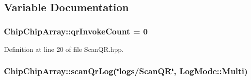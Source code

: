 \subsection{Variable Documentation}
\hypertarget{namespaceChipChipArray_a3b2a3c0ffa9f53021293aeb4955d2fef}{
\subsubsection[{qr\+Invoke\+Count}]{ Chip\+Chip\+Array\+::qr\+Invoke\+Count = 0}}\label{namespaceChipChipArray_a3b2a3c0ffa9f53021293aeb4955d2fef}


Definition at line 20 of file Scan\+Q\+R.\+hpp.

\hypertarget{namespaceChipChipArray_ab5c6290951637c25a5422707020fb3a8}{
\subsubsection[{scan\+Qr\+Log}]{ Chip\+Chip\+Array\+::scan\+Qr\+Log(\char`\"{}logs/{\bf Scan\+Q\+R}\char`\"{}, Log\+Mode\+::\+Multi)}}\label{namespaceChipChipArray_ab5c6290951637c25a5422707020fb3a8}
